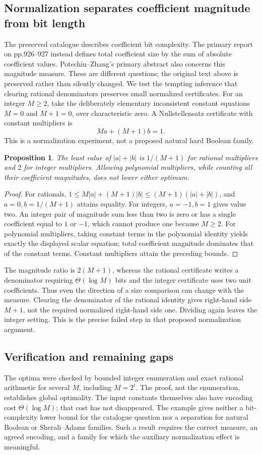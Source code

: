 \documentclass[11pt]{article}
\newtheorem{proposition}{Proposition}
\begin{document}
\subsection{Normalization separates coefficient magnitude from bit length}
The preserved catalogue describes coefficient bit complexity. The primary report on pp.926--927 instead defines total coefficient size by the sum of absolute coefficient values. Potechin--Zhang's primary abstract also concerns this magnitude measure. These are different questions; the original text above is preserved rather than silently changed.
We test the tempting inference that clearing rational denominators preserves small normalized certificates. For an integer $M\ge2$, take the deliberately elementary inconsistent constant equations $M=0$ and $M+1=0$, over characteristic zero. A Nullstellensatz certificate with constant multipliers is
\[
Ma+(M+1)b=1.
\]
This is a normalization experiment, not a proposed natural hard Boolean family.
\begin{proposition}
The least value of $|a|+|b|$ is $1/(M+1)$ for rational multipliers and $2$ for integer multipliers. Allowing polynomial multipliers, while counting all their coefficient magnitudes, does not lower either optimum.
\end{proposition}
\begin{proof}
For rationals, $1\le M|a|+(M+1)|b|\le(M+1)(|a|+|b|)$, and $a=0,b=1/(M+1)$ attains equality. For integers, $a=-1,b=1$ gives value two. An integer pair of magnitude sum less than two is zero or has a single coefficient equal to $1$ or $-1$, which cannot produce one because $M\ge2$. For polynomial multipliers, taking constant terms in the polynomial identity yields exactly the displayed scalar equation; total coefficient magnitude dominates that of the constant terms. Constant multipliers attain the preceding bounds.
\end{proof}
The magnitude ratio is $2(M+1)$, whereas the rational certificate writes a denominator requiring $\Theta(\log M)$ bits and the integer certificate uses two unit coefficients. Thus even the direction of a size comparison can change with the measure. Clearing the denominator of the rational identity gives right-hand side $M+1$, not the required normalized right-hand side one. Dividing again leaves the integer setting. This is the precise failed step in that proposed normalization argument.
\subsection{Verification and remaining gaps}
The optima were checked by bounded integer enumeration and exact rational arithmetic for several $M$, including $M=2^t$. The proof, not the enumeration, establishes global optimality. The input constants themselves also have encoding cost $\Theta(\log M)$; that cost has not disappeared. The example gives neither a bit-complexity lower bound for the catalogue question nor a separation for natural Boolean or Sherali--Adams families. Such a result requires the correct measure, an agreed encoding, and a family for which the auxiliary normalization effect is meaningful.
\end{document}
